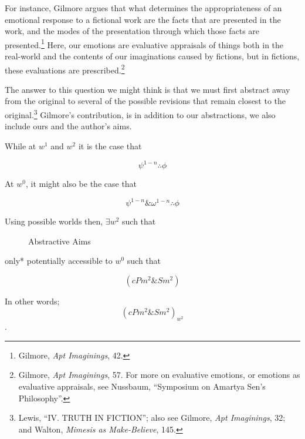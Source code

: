 \documentclass[phdthesis,12pt,final]{wuthesis}
\theoremstyle{definition}
\theoremstyle{definition}
\theoremstyle{definition}
\theoremstyle{definition}
\theoremstyle{remark}
\begin{document}
For instance, Gilmore argues that what determines the appropriateness of an emotional response to a fictional work are the facts that are presented in the work, and the modes of the presentation through which those facts are presented.\footnote{Gilmore, \emph{Apt {Imaginings}}, 42.} Here, our emotions are evaluative appraisals of things both in the real-world and the contents of our imaginations caused by fictions, but in fictions, these evaluations are prescribed.\footnote{Gilmore, \emph{Apt {Imaginings}}, 57. For more on evaluative emotions, or emotions as evaluative appraisals, see Nussbaum, {``Symposium on {Amartya Sen}'s Philosophy''}.}

\noindent The answer to this question we might think is that we must first abstract away from the original to several of the possible revisions that remain closest to the original.\footnote{Lewis, {``{IV}. {TRUTH IN FICTION}''}; also see Gilmore, \emph{Apt {Imaginings}}, 32; and Walton, \emph{Mimesis as {Make-Believe}}, 145.} Gilmore's contribution, is in addition to our abstractions, we also include ours and the author's aims.

While at \(w^{1}\) and \(w^{2}\) it is the case that

\[\psi^{1-n}\therefore\phi\]

\noindent At \(w^{0}\), it might also be the case that

\[\psi^{1-n}\&\omega^{1-n}\therefore\phi\]

\newpage

\noindent Using possible worlds then, \(\exists w^{2}\) such that

\begin{figure}
\centering
{}
\caption{Abstractive Aims}
\label{fig:abstractive-aims}
\end{figure}

\noindent *only* potentially accessible to \(w^{0}\) such that

\[( cPm^{2} \& Sm^{2} )\]

\noindent In other words; \[( cPm^{2} \& Sm^{2} )_{w^{2}}\].
\end{document}
